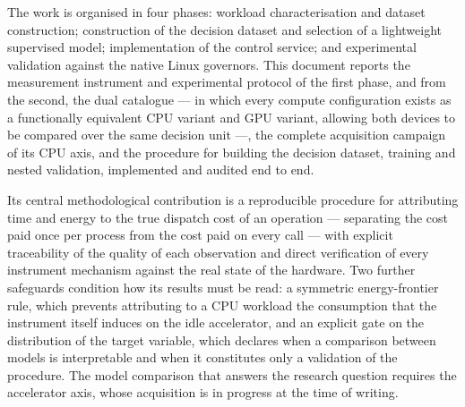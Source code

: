 \documentclass[12pt,oneside,spanish]{book}
\begin{document}
The work is organised in four phases: workload characterisation and dataset construction; construction of the decision dataset and selection of a lightweight supervised model; implementation of the control service; and experimental validation against the native Linux governors. This document reports the measurement instrument and experimental protocol of the first phase, and from the second, the dual catalogue --- in which every compute configuration exists as a functionally equivalent CPU variant and GPU variant, allowing both devices to be compared over the same decision unit ---, the complete acquisition campaign of its CPU axis, and the procedure for building the decision dataset, training and nested validation, implemented and audited end to end.

Its central methodological contribution is a reproducible procedure for attributing time and energy to the true dispatch cost of an operation --- separating the cost paid once per process from the cost paid on every call --- with explicit traceability of the quality of each observation and direct verification of every instrument mechanism against the real state of the hardware. Two further safeguards condition how its results must be read: a symmetric energy-frontier rule, which prevents attributing to a CPU workload the consumption that the instrument itself induces on the idle accelerator, and an explicit gate on the distribution of the target variable, which declares when a comparison between models is interpretable and when it constitutes only a validation of the procedure. The model comparison that answers the research question requires the accelerator axis, whose acquisition is in progress at the time of writing.


\clearpage
\tableofcontents


\clearpage
\listoftables


\clearpage
\listoffigures
\end{document}
